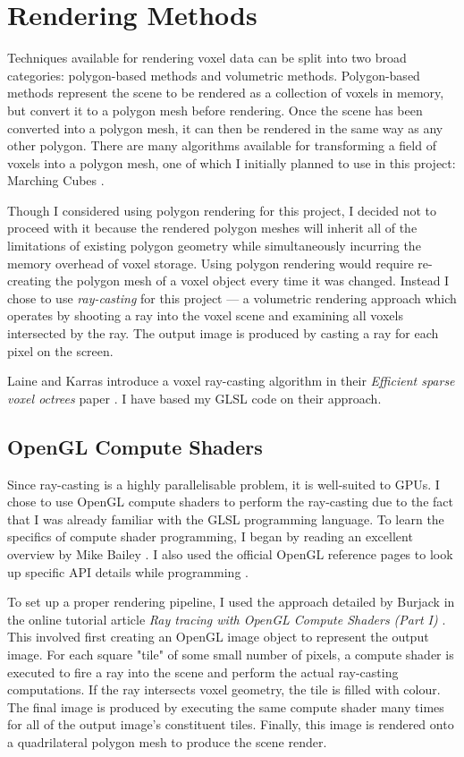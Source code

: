 \section{Rendering Methods}
Techniques available for rendering voxel data can be split into two broad categories: polygon-based methods and volumetric methods. Polygon-based methods represent the scene to be rendered as a collection of voxels in memory, but convert it to a polygon mesh before rendering. Once the scene has been converted into a polygon mesh, it can then be rendered in the same way as any other polygon. There are many algorithms available for transforming a field of voxels into a polygon mesh, one of which I initially planned to use in this project: Marching Cubes \autocite{lorensen1987marching}.

Though I considered using polygon rendering for this project, I decided not to proceed with it because the rendered polygon meshes will inherit all of the limitations of existing polygon geometry while simultaneously incurring the memory overhead of voxel storage. Using polygon rendering would require re-creating the polygon mesh of a voxel object every time it was changed. Instead I chose to use \textit{ray-casting} for this project --- a volumetric rendering approach which operates by shooting a ray into the voxel scene and examining all voxels intersected by the ray. The output image is produced by casting a ray for each pixel on the screen.

Laine and Karras introduce a voxel ray-casting algorithm in their \textit{Efficient sparse voxel octrees} paper \autocite{laine2010efficient}. I have based my GLSL code on their approach.

\subsection{OpenGL Compute Shaders}
Since ray-casting is a highly parallelisable problem, it is well-suited to GPUs. I chose to use OpenGL compute shaders to perform the ray-casting due to the fact that I was already familiar with the GLSL programming language. To learn the specifics of compute shader programming, I began by reading an excellent overview by Mike Bailey \autocite{bailey2014}. I also used the official OpenGL reference pages to look up specific API details while programming \autocite{gldocs}.

To set up a proper rendering pipeline, I used the approach detailed by Burjack in the online tutorial article \textit{Ray tracing with OpenGL Compute Shaders (Part I)} \autocite{burjack2017}. This involved first creating an OpenGL image object to represent the output image. For each square "tile" of some small number of pixels, a compute shader is executed to fire a ray into the scene and perform the actual ray-casting computations. If the ray intersects voxel geometry, the tile is filled with colour. The final image is produced by executing the same compute shader many times for all of the output image's constituent tiles. Finally, this image is rendered onto a quadrilateral polygon mesh to produce the scene render.

